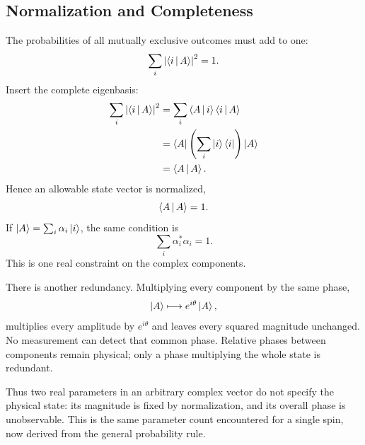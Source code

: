 \subsection{Normalization and Completeness}

The probabilities of all mutually exclusive outcomes must add to one:
\begin{equation}
\sum_i\left|\left\langle i\,\middle|\,A\right\rangle\right|^2=1.
\label{eq:probability-normalization}
\end{equation}
Insert the complete eigenbasis:
\begin{align}
\sum_i\left|\left\langle i\,\middle|\,A\right\rangle\right|^2
 &=\sum_i\left\langle A\,\middle|\,i\right\rangle\left\langle i\,\middle|\,A\right\rangle\\
 &=\left\langle A\right\rvert\left(\sum_i\left\lvert i\right\rangle\left\langle i\right\rvert\right)\left\lvert A\right\rangle\\
 &=\left\langle A\,\middle|\,A\right\rangle.
\end{align}
Hence an allowable state vector is normalized,
\begin{equation}
\left\langle A\,\middle|\,A\right\rangle=1.
\label{eq:state-normalization}
\end{equation}
If \(\left\lvert A\right\rangle=\sum_i\alpha_i\left\lvert i\right\rangle\), the same condition is
\begin{equation}
\sum_i\alpha_i^*\alpha_i=1.
\label{eq:component-normalization}
\end{equation}
This is one real constraint on the complex components.

\begin{classroomqa}
\end{classroomqa}

There is another redundancy. Multiplying every component by the same phase,
\begin{equation}
\left\lvert A\right\rangle\longmapsto e^{i\theta}\left\lvert A\right\rangle,
\label{eq:l3-global-phase}
\end{equation}
multiplies every amplitude by \(e^{i\theta}\) and leaves every squared magnitude unchanged. No measurement can detect that common phase. Relative phases between components remain physical; only a phase multiplying the whole state is redundant.

Thus two real parameters in an arbitrary complex vector do not specify the physical state: its magnitude is fixed by normalization, and its overall phase is unobservable. This is the same parameter count encountered for a single spin, now derived from the general probability rule.


